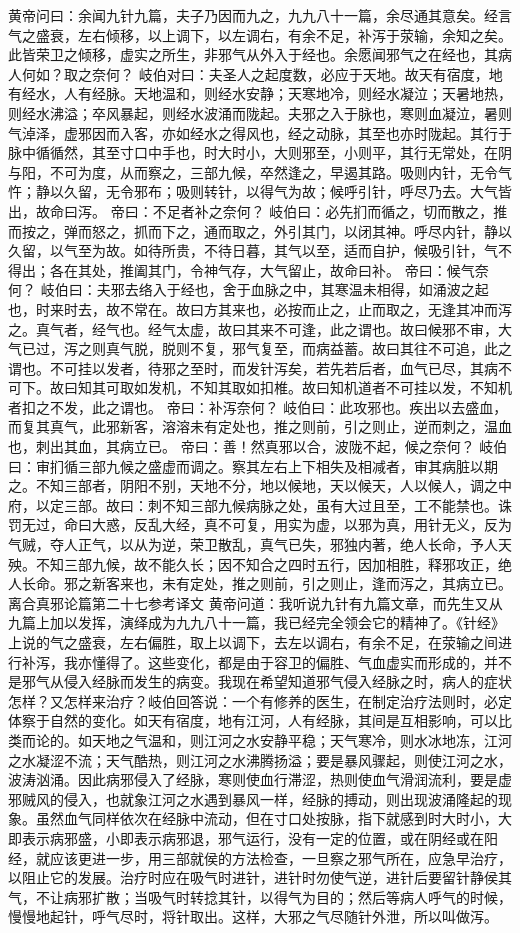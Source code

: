 \documentclass[a4paper,12pt,UTF8,twoside]{ctexbook}
\begin{document}
黄帝问曰：余闻九针九篇，夫子乃因而九之，九九八十一篇，余尽通其意矣。经言气之盛衰，左右倾移，以上调下，以左调右，有余不足，补泻于荥输，余知之矣。此皆荣卫之倾移，虚实之所生，非邪气从外入于经也。余愿闻邪气之在经也，其病人何如？取之奈何？
岐伯对曰：夫圣人之起度数，必应于天地。故天有宿度，地有经水，人有经脉。天地温和，则经水安静；天寒地冷，则经水凝泣；天暑地热，则经水沸溢；卒风暴起，则经水波涌而陇起。夫邪之入于脉也，寒则血凝泣，暑则气淖泽，虚邪因而入客，亦如经水之得风也，经之动脉，其至也亦时陇起。其行于脉中循循然，其至寸口中手也，时大时小，大则邪至，小则平，其行无常处，在阴与阳，不可为度，从而察之，三部九候，卒然逢之，早遏其路。吸则内针，无令气忤；静以久留，无令邪布；吸则转针，以得气为故；候呼引针，呼尽乃去。大气皆出，故命曰泻。
帝曰：不足者补之奈何？
岐伯曰：必先扪而循之，切而散之，推而按之，弹而怒之，抓而下之，通而取之，外引其门，以闭其神。呼尽内针，静以久留，以气至为故。如待所贵，不待日暮，其气以至，适而自护，候吸引针，气不得出；各在其处，推阖其门，令神气存，大气留止，故命曰补。
帝曰：候气奈何？
岐伯曰：夫邪去络入于经也，舍于血脉之中，其寒温未相得，如涌波之起也，时来时去，故不常在。故曰方其来也，必按而止之，止而取之，无逢其冲而泻之。真气者，经气也。经气太虚，故曰其来不可逢，此之谓也。故曰候邪不审，大气已过，泻之则真气脱，脱则不复，邪气复至，而病益蓄。故曰其往不可追，此之谓也。不可挂以发者，待邪之至时，而发针泻矣，若先若后者，血气已尽，其病不可下。故曰知其可取如发机，不知其取如扣椎。故曰知机道者不可挂以发，不知机者扣之不发，此之谓也。
帝曰：补泻奈何？
岐伯曰：此攻邪也。疾出以去盛血，而复其真气，此邪新客，溶溶未有定处也，推之则前，引之则止，逆而刺之，温血也，刺出其血，其病立已。
帝曰：善！然真邪以合，波陇不起，候之奈何？
岐伯曰：审扪循三部九候之盛虚而调之。察其左右上下相失及相减者，审其病脏以期之。不知三部者，阴阳不别，天地不分，地以候地，天以候天，人以候人，调之中府，以定三部。故曰：刺不知三部九候病脉之处，虽有大过且至，工不能禁也。诛罚无过，命曰大惑，反乱大经，真不可复，用实为虚，以邪为真，用针无义，反为气贼，夺人正气，以从为逆，荣卫散乱，真气已失，邪独内著，绝人长命，予人天殃。不知三部九候，故不能久长；因不知合之四时五行，因加相胜，释邪攻正，绝人长命。邪之新客来也，未有定处，推之则前，引之则止，逢而泻之，其病立已。
离合真邪论篇第二十七参考译文
黄帝问道：我听说九针有九篇文章，而先生又从九篇上加以发挥，演绎成为九九八十一篇，我已经完全领会它的精神了。《针经》上说的气之盛衰，左右偏胜，取上以调下，去左以调右，有余不足，在荥输之间进行补泻，我亦懂得了。这些变化，都是由于容卫的偏胜、气血虚实而形成的，并不是邪气从侵入经脉而发生的病变。我现在希望知道邪气侵入经脉之时，病人的症状怎样？又怎样来治疗？岐伯回答说：一个有修养的医生，在制定治疗法则时，必定体察于自然的变化。如天有宿度，地有江河，人有经脉，其间是互相影响，可以比类而论的。如天地之气温和，则江河之水安静平稳；天气寒冷，则水冰地冻，江河之水凝涩不流；天气酷热，则江河之水沸腾扬溢；要是暴风骤起，则使江河之水，波涛汹涌。因此病邪侵入了经脉，寒则使血行滞涩，热则使血气滑润流利，要是虚邪贼风的侵入，也就象江河之水遇到暴风一样，经脉的搏动，则出现波涌隆起的现象。虽然血气同样依次在经脉中流动，但在寸口处按脉，指下就感到时大时小，大即表示病邪盛，小即表示病邪退，邪气运行，没有一定的位置，或在阴经或在阳经，就应该更进一步，用三部就侯的方法检查，一旦察之邪气所在，应急早治疗，以阻止它的发展。治疗时应在吸气时进针，进针时勿使气逆，进针后要留针静侯其气，不让病邪扩散；当吸气时转捻其针，以得气为目的；然后等病人呼气的时候，慢慢地起针，呼气尽时，将针取出。这样，大邪之气尽随针外泄，所以叫做泻。
\end{document}
